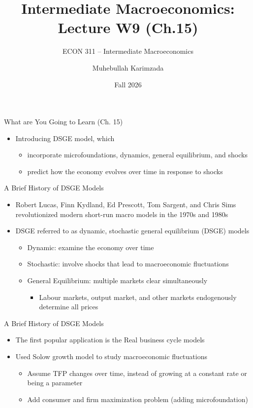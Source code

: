 \documentclass[aspectratio=1610]{beamer}
\title[Winter - Lecture 9] %
{Intermediate Macroeconomics: Lecture  W9 (Ch.15)}
\subtitle{ECON 311 -- Intermediate Macroeconomics}
\author{Muhebullah Karimzada}
\institute{School of Economics \\\ University of Northern British Columbia}
\date{Fall 2026}
\begin{document}
\begin{frame}[plain]
  \titlepage
\end{frame}

\begin{frame}[wide]{What are You Going to Learn (Ch. 15)}
	\begin{itemize}
		\item Introducing DSGE model, which
		\begin{itemize}
			\item incorporate microfoundations, dynamics, general equilibrium, and shocks
			\item predict how the economy evolves over time in response to shocks
		\end{itemize}
	\end{itemize}
\end{frame}

\begin{frame}[wide]{A Brief History of DSGE Models}
	\begin{itemize}
		\item Robert Lucas, Finn Kydland, Ed Prescott, Tom Sargent, and Chris Sims revolutionized modern short-run macro models in the 1970s and 1980s
		\item DSGE referred to as dynamic, stochastic general equilibrium (DSGE) models
		\begin{itemize}
			\item Dynamic: examine the economy over time
			\item Stochastic: involve shocks that lead to macroeconomic fluctuations
			\item General Equilibrium: multiple markets clear simultaneously
			\begin{itemize}
				\item Labour markets, output market, and other markets endogenously determine all prices
			\end{itemize}
		\end{itemize}
	\end{itemize}
\end{frame}

\begin{frame}[wide]{A Brief History of DSGE Models}
	\begin{itemize}
		\item The first popular application is the Real business cycle models
		\item Used Solow growth model to study macroeconomic fluctuations
		\begin{itemize}
			\item Assume TFP changes over time, instead of growing at a constant rate or being a parameter 
			\item Add consumer and firm maximization problem (adding microfoundation)
		\end{itemize}
	\end{itemize}
\end{frame}
\end{document}
